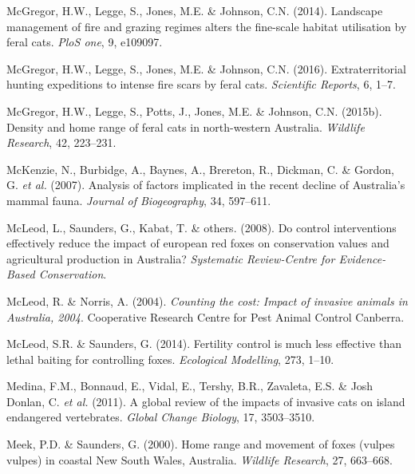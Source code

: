 \documentclass[11pt,a4paper,titlepage,twoside,openright]{style/unimelbthesis}
\begin{document}
\begin{mainmatter}
\leavevmode\hypertarget{ref-mcgregor2014landscape}{}%
McGregor, H.W., Legge, S., Jones, M.E. \& Johnson, C.N. (2014). Landscape management of fire and grazing regimes alters the fine-scale habitat utilisation by feral cats. \emph{PloS one}, 9, e109097.

\leavevmode\hypertarget{ref-mcgregor2016extraterritorial}{}%
McGregor, H.W., Legge, S., Jones, M.E. \& Johnson, C.N. (2016). Extraterritorial hunting expeditions to intense fire scars by feral cats. \emph{Scientific Reports}, 6, 1--7.

\leavevmode\hypertarget{ref-mcgregor2015density}{}%
McGregor, H.W., Legge, S., Potts, J., Jones, M.E. \& Johnson, C.N. (2015b). Density and home range of feral cats in north-western Australia. \emph{Wildlife Research}, 42, 223--231.

\leavevmode\hypertarget{ref-mckenzie2007analysis}{}%
McKenzie, N., Burbidge, A., Baynes, A., Brereton, R., Dickman, C. \& Gordon, G. \emph{et al.} (2007). Analysis of factors implicated in the recent decline of Australia's mammal fauna. \emph{Journal of Biogeography}, 34, 597--611.

\leavevmode\hypertarget{ref-mcleod2008control}{}%
McLeod, L., Saunders, G., Kabat, T. \& others. (2008). Do control interventions effectively reduce the impact of european red foxes on conservation values and agricultural production in Australia? \emph{Systematic Review-Centre for Evidence-Based Conservation}.

\leavevmode\hypertarget{ref-mcleod2004counting}{}%
McLeod, R. \& Norris, A. (2004). \emph{Counting the cost: Impact of invasive animals in Australia, 2004}. Cooperative Research Centre for Pest Animal Control Canberra.

\leavevmode\hypertarget{ref-mcleod2014fertility}{}%
McLeod, S.R. \& Saunders, G. (2014). Fertility control is much less effective than lethal baiting for controlling foxes. \emph{Ecological Modelling}, 273, 1--10.

\leavevmode\hypertarget{ref-medina2011global}{}%
Medina, F.M., Bonnaud, E., Vidal, E., Tershy, B.R., Zavaleta, E.S. \& Josh Donlan, C. \emph{et al.} (2011). A global review of the impacts of invasive cats on island endangered vertebrates. \emph{Global Change Biology}, 17, 3503--3510.

\leavevmode\hypertarget{ref-meek2000home}{}%
Meek, P.D. \& Saunders, G. (2000). Home range and movement of foxes (vulpes vulpes) in coastal New South Wales, Australia. \emph{Wildlife Research}, 27, 663--668.


\end{mainmatter}
\end{document}
